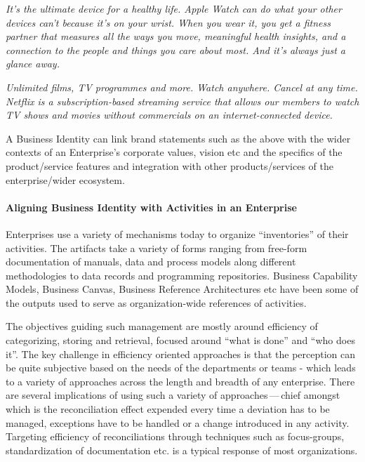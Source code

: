 \begin{description}[font=\bfseries,nosep,leftmargin=!,labelwidth=\widthof{\bfseries Apple Watch}]
    \item[Apple Watch] 
                       \textit{It’s the ultimate device for a healthy life.
                       Apple Watch can do what your other devices can't because it's on your wrist.
                       When you wear it, you get a fitness partner that measures all the ways you move,
                       meaningful health insights, and a connection to the people and things you care about most.
                       And it's always just a glance away.}
    \item[Netflix]     
                       \textit{Unlimited films, TV programmes and more. Watch anywhere. Cancel at any time.
                       Netflix is a subscription-based streaming service that allows our members to watch TV shows
                       and movies without commercials on an internet-connected device.}
\end{description}

A Business Identity can link brand statements such as the above with the wider contexts of an
Enterprise’s corporate values, vision etc and the specifics of the product/service features and
integration with other products/services of the enterprise/wider ecosystem.

\paragraph*{Aligning Business Identity with Activities in an Enterprise}

Enterprises use a variety of mechanisms today to organize “inventories” of their activities.
The artifacts take a variety of forms ranging from free-form documentation of manuals,
data and process models along different methodologies to data records and programming repositories.
Business Capability Models, Business Canvas, Business Reference Architectures etc have been some of the
outputs used to serve as organization-wide references of activities.

The objectives guiding such management are mostly around efficiency of categorizing, storing and retrieval,
focused around “what is done” and “who does it”.
The key challenge in efficiency oriented approaches is that the perception can be quite subjective based
on the needs of the departments or teams - which leads to a variety of approaches across the length and
breadth of any enterprise.
There are several implications of using such a variety of approaches\,---\,chief amongst which is the
reconciliation effect expended every time a deviation has to be managed,
exceptions have to be handled or a change introduced in any activity.
Targeting efficiency of reconciliations through techniques such as focus-groups, standardization of documentation etc.
is a typical response of most organizations.

